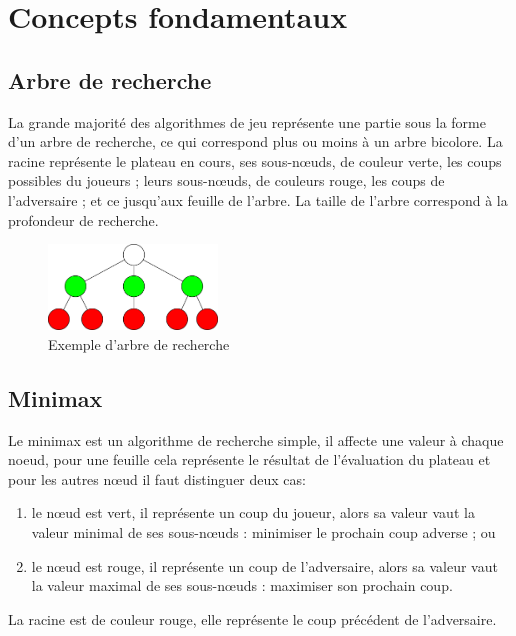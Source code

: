 \section{Concepts fondamentaux}

	\subsection{Arbre de recherche}
		La grande majorité des algorithmes de jeu
		représente une partie sous la forme d'un arbre de recherche, ce qui correspond
		plus ou moins à un arbre bicolore.
		La racine représente le plateau en cours, ses sous-n\oe{}uds, de couleur verte, les
		coups possibles du joueurs ; leurs sous-n\oe{}uds, de couleurs rouge, les coups de
		l'adversaire ; et ce jusqu'aux feuille de l'arbre. La taille de l'arbre correspond
		à la profondeur de recherche.

		\begin{figure}[h]
			\centering
			\includegraphics[width=0.40\textwidth]{images/arbre_recherche.png}
			\caption{Exemple d'arbre de recherche}
			\label{fig:arbre_recherche}
		\end{figure}

	\subsection{Minimax}
		Le minimax est un algorithme de recherche simple, il
		affecte une valeur à chaque noeud, pour une feuille cela représente le résultat
		de l'évaluation du plateau et pour les autres n\oe{}ud il faut distinguer deux cas:

		\begin{enumerate}
			\item le n\oe{}ud est vert, il représente un coup du joueur, alors sa valeur
				vaut la valeur minimal de ses sous-n\oe{}uds : minimiser le prochain coup adverse ; ou
			\item le n\oe{}ud est rouge, il représente un coup de l'adversaire, alors sa valeur
				vaut la valeur maximal de ses sous-n\oe{}uds : maximiser son prochain coup.
		\end{enumerate}

		La racine est de couleur rouge, elle représente le coup précédent de l'adversaire.

